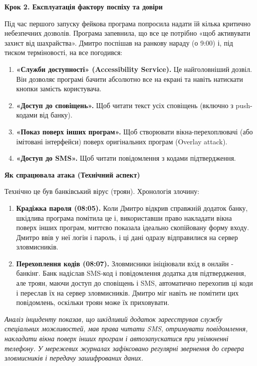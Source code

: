 \textbf{Крок 2. Експлуатація фактору поспіху та довіри}

Під час першого запуску фейкова програма попросила надати їй кілька критично небезпечних дозволів. Програма запевнила, що все це потрібно «щоб активувати захист від шахрайства». Дмитро поспішав на ранкову нараду (о 9:00) і, під тиском терміновості, на все погодився:

\begin{enumerate}
    \item \textbf{«Служби доступності» (Accessibility Service).} Це найголовніший дозвіл. Він дозволяє програмі бачити абсолютно все на екрані та навіть натискати кнопки замість користувача.
    \item \textbf{«Доступ до сповіщень».} Щоб читати текст усіх сповіщень (включно з push-кодами від банку).
    \item \textbf{«Показ поверх інших програм».} Щоб створювати вікна-перехоплювачі (або імітовані інтерфейси) поверх оригінальних програм (Overlay attack).
    \item \textbf{«Доступ до SMS».} Щоб читати повідомлення з кодами підтвердження.
\end{enumerate}

\textbf{Як спрацювала атака (Технічний аспект)}

Технічно це був банківський вірус (троян). Хронологія злочину:

\begin{enumerate}
    \item \textbf{Крадіжка пароля (08:05).} Коли Дмитро відкрив справжній додаток банку, шкідлива програма помітила це і, використавши право накладати вікна поверх інших програм, миттєво показала ідеально скопійовану форму входу. Дмитро ввів у неї логін і пароль, і ці дані одразу відправилися на сервер зловмисників.
    
    \item \textbf{Перехоплення кодів (08:07).} Зловмисники ініціювали вхід в онлайн ‑ банкінг. Банк надіслав SMS‑код і повідомлення додатка для підтвердження, але троян, маючи доступ до сповіщень і SMS, автоматично перехопив ці коди і переслав їх на сервер зловмисників. Дмитро міг навіть не помітити цих повідомлень, оскільки троян може їх приховувати.
\end{enumerate}

\textit{Аналіз інциденту показав, що шкідливий додаток зареєстрував службу спеціальних можливостей, мав права читати SMS, отримувати повідомлення, накладати вікна поверх інших програм і автозапускатися при увімкненні телефону. У мережевих журналах зафіксовано регулярні звернення до сервера зловмисників і передачу зашифрованих даних.}

